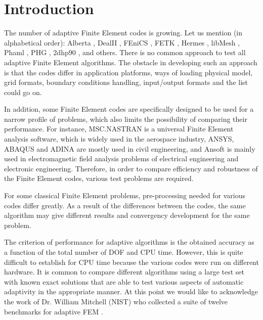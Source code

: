 \section{Introduction}
\label{sec:intro}

The number of adaptive Finite Element codes is growing.
Let us mention (in alphabetical order): Alberta
\cite{alberta}, DealII \cite{dealii}, FEniCS
\cite{fenics}, FETK \cite{fetk}, Hermes \cite{hermes}, 
libMesh \cite{libmesh}, Phaml \cite{phaml}, PHG \cite{phg}, 
2dhp90 \cite{2dhp90}, and others.
There is no common approach to test all adaptive 
Finite Element algorithms. The obstacle in developing such an approach is that the codes differ in application platforms, ways of loading physical model, grid formats, boundary conditions handling, input/output formats and the list could go on. 

In addition, some Finite Element codes are specifically designed to be used for a narrow profile of problems, which also limits the possibility of comparing their performance.
For instance, MSC.NASTRAN is a universal Finite Element analysis software, 
which is widely used in the aerospace industry, ANSYS, ABAQUS and ADINA are 
mostly used in civil engineering, and Ansoft is mainly used in electromagnetic 
field analysis problems of electrical engineering and electronic engineering. 
Therefore, in order to compare efficiency and robustness of the Finite Element codes, various test problems are required. 

For some classical Finite Element problems, pre-processing needed for various codes differ greatly. As a result of the differences between the codes, the same algorithm may give different results and convergency development for the same problem.

The criterion of performance for adaptive algorithms is the obtained accuracy as a function of the total number
of DOF and CPU time. However, this is quite difficult to establish
for CPU time because the various codes were run on different hardware.
It is common to compare different algorithms using a large test set
with known exact solutions that are able to test various aspects of
automatic adaptivity in the appropriate manner. 
At this point we would like to acknowledge the work of
Dr. William Mitchell (NIST) who collected a suite of
twelve benchmarks for adaptive FEM \cite{mitchell-1}. 

